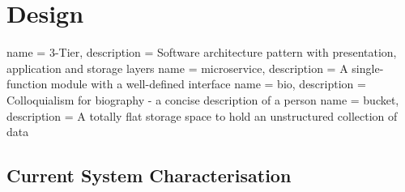 \documentclass{article}
\begin{document}
\section{Design}
\label{sec:design}
    {
        name = 3-Tier,
        description = {Software architecture pattern with presentation, application and storage layers}
    }
    {
        name = microservice,
        description = {A single-function module with a well-defined interface}
     }
    {
        name = bio,
        description = {Colloquialism for biography - a concise description of a person}
    }
    {
        name = bucket,
        description = {A totally flat storage space to hold an unstructured collection of data}
    }

    \subsection{Current System Characterisation}
    
\end{document}
